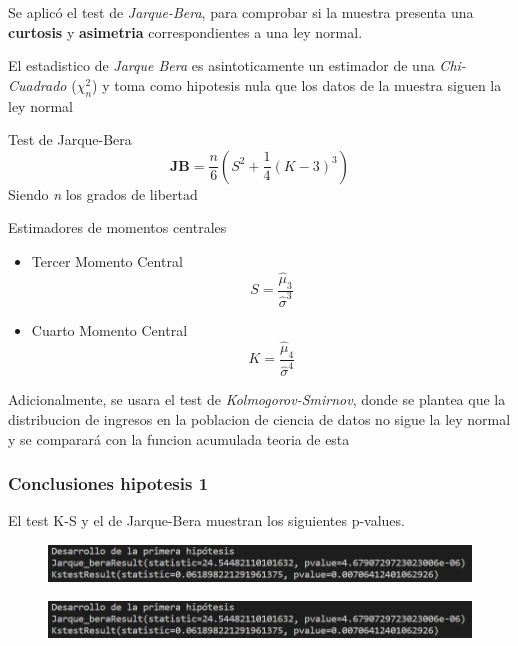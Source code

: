 \documentclass{beamer}
\begin{document}
\begin{frame}

  Se aplicó el test de \textit{Jarque-Bera}, para comprobar si la muestra
  presenta una \textbf{curtosis} y \textbf{asimetria} correspondientes
  a una ley normal.

  El estadistico de \textit{Jarque Bera} es asintoticamente un estimador de
  una \textit{Chi-Cuadrado} (${\chi_n ^ 2}$) y toma como hipotesis nula que los datos de la
  muestra siguen la ley normal

  \begin{alertblock}{Test de Jarque-Bera}
    \[\textbf{JB} = \frac{n}{6}(S^2 +\frac{1}{4}(K - 3)^3)\] Siendo \textit{n} los grados de libertad
  \end{alertblock}

  \begin{block}{Estimadores de momentos centrales}
    \begin{itemize}
        \item Tercer Momento Central
          \[S = \frac{\hat{\mu}_3}{\hat{\sigma}^3}\]

        \item  Cuarto Momento Central
         \[K = \frac{\hat{\mu}_4}{\hat{\sigma}^4}\]
    \end{itemize}
  \end{block}
\end{frame}

\begin{frame}
  Adicionalmente, se usara el test de \textit{Kolmogorov-Smirnov}, donde se plantea
  que la distribucion de ingresos en la poblacion de ciencia de datos
  no sigue la ley normal y se comparará con la funcion acumulada teoria
  de esta

\end{frame}

\begin{frame}
\frametitle{Conclusiones hipotesis 1}
  El test K-S y el de Jarque-Bera muestran los siguientes p-values.
  \begin{figure}[t]
        \includegraphics[width=12cm]{p-val-1.jpg}
    \end{figure}
    \begin{figure}[t]
          \includegraphics[width=12cm]{p-val-1.jpg}
      \end{figure}
    \end{frame}
\end{document}
